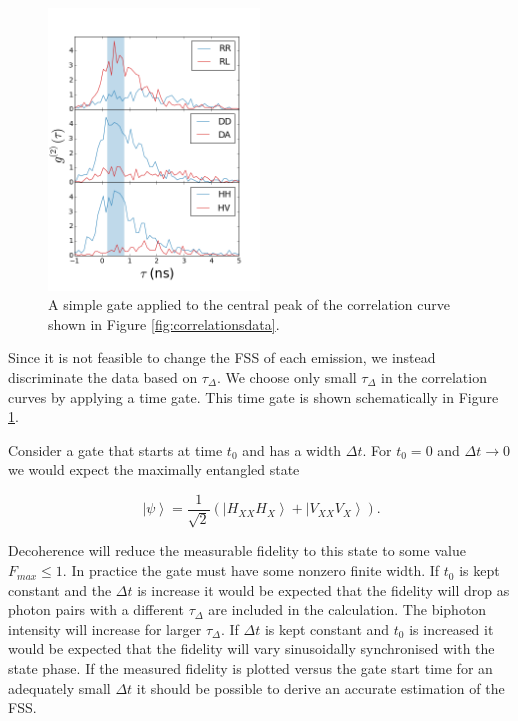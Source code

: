 \documentclass[12pt, twoside]{article}
\numberwithin{equation}{section}
\begin{document}
\begin{figure}[h!]
    \centering
    \includegraphics[width=0.5\textwidth]{notebooks/correlations_gate.png}
    \caption{A simple gate applied to the central peak of the correlation curve shown in Figure \ref{fig:correlationsdata}.}
    \label{fig:timegateschematic}
\end{figure}

Since it is not feasible to change the FSS of each emission, we instead
discriminate the data based on $\tau_\Delta$. We choose only small
$\tau_\Delta$ in the correlation curves by applying a time gate. This
time gate is shown schematically in Figure \ref{fig:timegateschematic}.

Consider a gate that starts at time $t_0$ and has a width $\Delta t$.
For $t_0 = 0$ and $\Delta t \to 0$ we would expect the maximally
entangled state

\begin{equation}
\ \left|\psi\right\rangle = \frac{1}{\sqrt{2}} 
\left(\left|H_{XX} H_X\right\rangle + \left|V_{XX} V_X\right\rangle \right).
\end{equation}

Decoherence\cite{hudson} will reduce the measurable fidelity to this
state to some value $F_{max} \leq 1$. In practice the gate must have
some nonzero finite width. If $t_0$ is kept constant and the $\Delta t$
is increase it would be expected that the fidelity will drop as photon
pairs with a different $\tau_\Delta$ are included in the calculation.
The biphoton intensity will increase for larger $\tau_\Delta$. If
$\Delta t$ is kept constant and $t_0$ is increased it would be expected
that the fidelity will vary sinusoidally synchronised with the state
phase. If the measured fidelity is plotted versus the gate start time
for an adequately small $\Delta t$ it should be possible to derive an
accurate estimation of the FSS.
\end{document}
